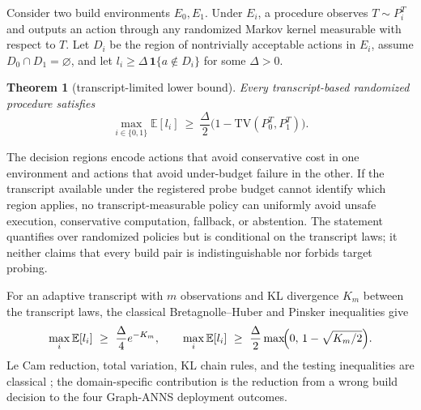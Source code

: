 \documentclass{article}
\newtheorem{theorem}{Theorem}
\newcommand{\TV}{\mathrm{TV}}
\newcommand{\E}{\mathbb{E}}
\begin{document}
Consider two build environments $E_0,E_1$. Under $E_i$, a procedure observes $T\sim P_i^{T}$ and outputs an
action through any randomized Markov kernel measurable with respect to $T$. Let $D_i$ be the region of
nontrivially acceptable actions in $E_i$, assume $D_0\cap D_1=\varnothing$, and let
$l_i\ge\Delta\,\mathbf{1}\{a\notin D_i\}$ for some $\Delta>0$.

\begin{theorem}[transcript-limited lower bound]
Every transcript-based randomized procedure satisfies
\begin{equation}
\max_{i\in\{0,1\}}\E[l_{i}]\ \ge\ \frac{\Delta}{2}\bigl(1-\TV(P_{0}^{T},P_{1}^{T})\bigr).
\label{eq:thm1}
\end{equation}
\end{theorem}

The decision regions encode actions that avoid conservative cost in one environment and actions that avoid
under-budget failure in the other. If the transcript available under the registered probe budget cannot
identify which region applies, no transcript-measurable policy can uniformly avoid unsafe execution,
conservative computation, fallback, or abstention. The statement quantifies over randomized policies but is
conditional on the transcript laws; it neither claims that every build pair is indistinguishable nor
forbids target probing.

For an adaptive transcript with $m$ observations and KL divergence $K_m$ between the transcript laws, the
classical Bretagnolle--Huber and Pinsker inequalities give
\begin{equation}
\max_{i}\E[l_{i}]\ \ge\ \frac{\Delta}{4}e^{-K_{m}},\qquad
\max_{i}\E[l_{i}]\ \ge\ \frac{\Delta}{2}\max\!\Bigl(0,\,1-\sqrt{K_{m}/2}\Bigr).
\label{eq:bh}
\end{equation}
Le Cam reduction, total variation, KL chain rules, and the testing inequalities are classical
\citep{yu1997assouad}; the domain-specific contribution is the reduction from a wrong build decision to the
four Graph-ANNS deployment outcomes.
\end{document}
